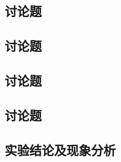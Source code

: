 \documentclass[signature=data]{physicsreport}
\begin{document}
\maketitle
\subsection{讨论题}

\newpage
\subsection{讨论题}
\subsection{讨论题}

\newpage
\subsection{讨论题}

\newpage

\subsection{实验结论及现象分析}
\end{document}
